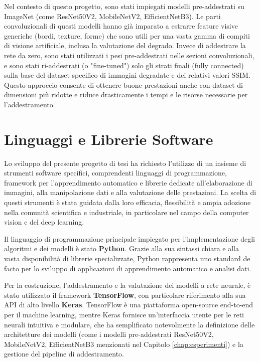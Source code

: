Nel contesto di questo progetto, sono stati impiegati modelli pre-addestrati su ImageNet (come ResNet50V2, MobileNetV2, EfficientNetB3). Le parti convoluzionali di questi modelli hanno già imparato a estrarre feature visive generiche (bordi, texture, forme) che sono utili per una vasta gamma di compiti di visione artificiale, inclusa la valutazione del degrado. Invece di addestrare la rete da zero, sono stati utilizzati i pesi pre-addestrati nelle sezioni convoluzionali, e sono stati ri-addestrati (o "fine-tuned") solo gli strati finali (fully connected) sulla base del dataset specifico di immagini degradate e dei relativi valori SSIM. Questo approccio consente di ottenere buone prestazioni anche con dataset di dimensioni più ridotte e riduce drasticamente i tempi e le risorse necessarie per l'addestramento.

\section{Linguaggi e Librerie Software}

Lo sviluppo del presente progetto di tesi ha richiesto l'utilizzo di un insieme di strumenti software specifici, comprendenti linguaggi di programmazione, framework per l'apprendimento automatico e librerie dedicate all'elaborazione di immagini, alla manipolazione dati e alla valutazione delle prestazioni. La scelta di questi strumenti è stata guidata dalla loro efficacia, flessibilità e ampia adozione nella comunità scientifica e industriale, in particolare nel campo della computer vision e del deep learning.

Il linguaggio di programmazione principale impiegato per l'implementazione degli algoritmi e dei modelli è stato \textbf{Python}. Grazie alla sua sintassi chiara e alla vasta disponibilità di librerie specializzate, Python rappresenta uno standard de facto per lo sviluppo di applicazioni di apprendimento automatico e analisi dati.

Per la costruzione, l'addestramento e la valutazione dei modelli a rete neurale, è stato utilizzato il framework \textbf{TensorFlow}, con particolare riferimento alla sua API di alto livello \textbf{Keras}. TensorFlow è una piattaforma open-source end-to-end per il machine learning, mentre Keras fornisce un'interfaccia utente per le reti neurali intuitiva e modulare, che ha semplificato notevolmente la definizione delle architetture dei modelli (come i modelli pre-addestrati ResNet50V2, MobileNetV2, EfficientNetB3 menzionati nel Capitolo \ref{chap:esperimenti}) e la gestione del pipeline di addestramento.

